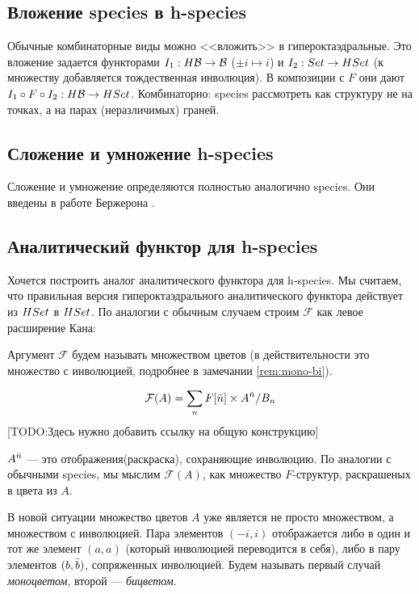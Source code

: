 \subsection{Вложение species в h-species}
Обычные комбинаторные виды можно <<вложить>> в гипероктаэдральные. Это вложение
задается функторами $I_1:H\mathcal B \rightarrow \mathcal B$ ($\pm i \mapsto i$) и $I_2:Set
\rightarrow HSet$ (к множеству добавляется тождественная инволюция).
В композиции с $F$ они дают $I_1 \circ F \circ I_2 : H\mathcal B \rightarrow HSet$.
Комбинаторно: species рассмотреть как структуру не на точках, а на
парах (неразличимых) граней.

\subsection{Сложение и умножение h-species}
Сложение и умножение определяются полностью аналогично species. Они введены в
работе Бержерона \cite{BergH}.

\subsection{Аналитический функтор для h-species}
Хочется построить аналог аналитического функтора для h-species. Мы считаем, что
правильная версия гипероктаэдрального аналитического функтора действует из
$HSet$ в $HSet$. По аналогии с обычным случаем строим $\mathcal F$ как левое
расширение Кана:


Аргумент $\mathcal F$ будем называть множеством цветов (в действительности это
множество с инволюцией, подробнее в замечании \ref{rem:mono-bi}).

\begin{equation}
\label{eq:h-an}
	\mathcal F(A) = \sum\limits_n F[\Bar n] \times A^{\Bar n} / B_n
\end{equation}
[TODO:Здесь нужно добавить ссылку на общую конструкцию]

$A^{\Bar n}$ --- это отображения(раскраска), сохраняющие инволюцию. По
аналогии с обычными species, мы мыслим $\mathcal F(A)$, как множество
$F$-структур, раскрашеных в цвета из $A$.
\begin{remark}
\label{rem:mono-bi}
В новой ситуации множество цветов $A$ уже является не просто множеством, а
множеством с инволюцией. Пара элементов $(-i, i)$ отображается либо
в один и тот же элемент $(a, a)$ (который инволюцией переводится в себя), либо
в пару элементов $(b, \Bar b)$, сопряженных инволюцией. Будем называть первый
случай \emph{моноцветом}, второй --- \emph{бицветом}.
\end{remark}


